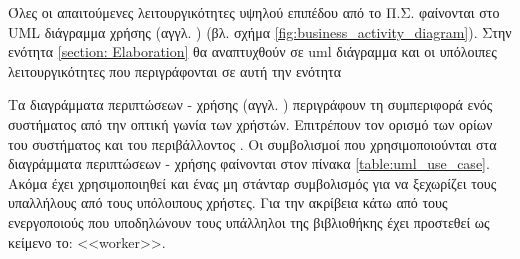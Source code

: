 \documentclass{assignment}
\begin{document}
Όλες οι απαιτούμενες λειτουργικότητες υψηλού επιπέδου από το Π.Σ. φαίνονται στο UML διάγραμμα χρήσης (αγγλ. ) (βλ. σχήμα \ref{fig:business_activity_diagram}). Στην ενότητα \ref{section: Elaboration} θα αναπτυχθούν σε uml διάγραμμα και οι υπόλοιπες λειτουργικότητες που περιγράφονται σε αυτή την ενότητα

Τα διαγράμματα περιπτώσεων - χρήσης (αγγλ. ) περιγράφουν τη συμπεριφορά ενός συστήματος από την οπτική γωνία των χρήστών. Επιτρέπουν τον ορισμό των ορίων του συστήματος και του περιβάλλοντος \cite{virvou_uml}. Οι συμβολισμοί που χρησιμοποιούνται στα διαγράμματα περιπτώσεων - χρήσης φαίνονται στον πίνακα \ref{table:uml_use_case}. Ακόμα έχει χρησιμοποιηθεί και ένας μη στάνταρ συμβολισμός για να ξεχωρίζει τους υπαλλήλους από τους υπόλοιπους χρήστες. Για την ακρίβεια κάτω από τους ενεργοποιούς που υποδηλώνουν τους υπάλληλοι της βιβλιοθήκης έχει προστεθεί ως κείμενο το: <<worker>>.
\end{document}
